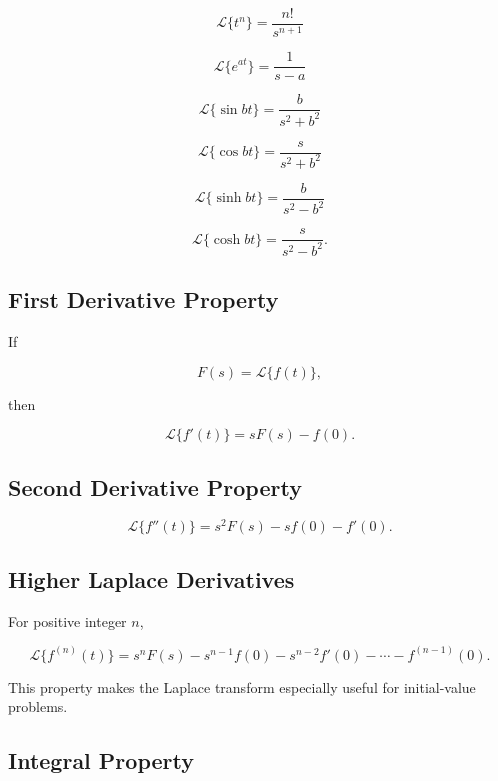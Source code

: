 \[
\boxed{
\mathcal{L}\{t^n\}
=
\frac{n!}{s^{n+1}}
}
\]

\[
\boxed{
\mathcal{L}\{e^{at}\}
=
\frac1{s-a}
}
\]

\[
\boxed{
\mathcal{L}\{\sin bt\}
=
\frac{b}{s^2+b^2}
}
\]

\[
\boxed{
\mathcal{L}\{\cos bt\}
=
\frac{s}{s^2+b^2}
}
\]

\[
\boxed{
\mathcal{L}\{\sinh bt\}
=
\frac{b}{s^2-b^2}
}
\]

\[
\boxed{
\mathcal{L}\{\cosh bt\}
=
\frac{s}{s^2-b^2}.
}
\]

\subsection{First Derivative Property}
\label{subsec:laplace-first-derivative}

If

\[
F(s)=\mathcal{L}\{f(t)\},
\]

then

\[
\boxed{
\mathcal{L}\{f'(t)\}
=
sF(s)-f(0).
}
\]

\subsection{Second Derivative Property}
\label{subsec:laplace-second-derivative}

\[
\boxed{
\mathcal{L}\{f''(t)\}
=
s^2F(s)
-
sf(0)
-
f'(0).
}
\]

\subsection{Higher Laplace Derivatives}
\label{subsec:laplace-higher-derivatives}

For positive integer \(n\),

\[
\boxed{
\mathcal{L}\{f^{(n)}(t)\}
=
s^nF(s)
-
s^{n-1}f(0)
-
s^{n-2}f'(0)
-\cdots
-
f^{(n-1)}(0).
}
\]

This property makes the Laplace transform especially useful for initial-value
problems.

\subsection{Integral Property}
\label{subsec:laplace-integral-property}

